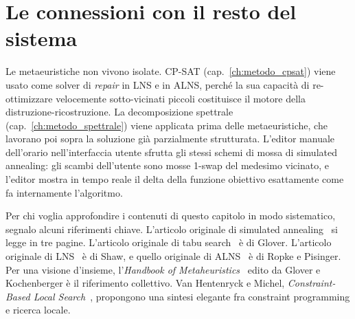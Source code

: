 \section{Le connessioni con il resto del sistema}

Le metaeuristiche non vivono isolate. CP-SAT
(cap.~\ref{ch:metodo_cpsat}) viene usato come solver di
\emph{repair} in LNS e in ALNS, perch\'e la sua capacit\`a
di re-ottimizzare velocemente sotto-vicinati piccoli
costituisce il motore della distruzione-ricostruzione. La
decomposizione spettrale (cap.~\ref{ch:metodo_spettrale})
viene applicata prima delle metaeuristiche, che lavorano poi
sopra la soluzione gi\`a parzialmente strutturata. L'editor
manuale dell'orario nell'interfaccia utente sfrutta gli
stessi schemi di mossa di simulated annealing: gli scambi
dell'utente sono mosse 1-swap del medesimo vicinato, e
l'editor mostra in tempo reale il delta della funzione
obiettivo esattamente come fa internamente l'algoritmo.

\begin{biblioparvabox}
Per chi voglia approfondire i contenuti di questo capitolo
in modo sistematico, segnalo alcuni riferimenti chiave.
L'articolo originale di simulated
annealing~\parencite{kirkpatrick1983} si legge in tre
pagine. L'articolo originale di tabu
search~\parencite{glover1986} \`e di Glover. L'articolo
originale di LNS~\parencite{shaw1998} \`e di Shaw, e
quello originale di ALNS~\parencite{ropke2006} \`e di
Ropke e Pisinger. Per una visione d'insieme, l'\emph{Handbook
of Metaheuristics}~\parencite{glover2003} edito da Glover e
Kochenberger \`e il riferimento collettivo. Van Hentenryck e
Michel, \emph{Constraint-Based Local
Search}~\parencite{vanhentenryck2005}, propongono una sintesi
elegante fra constraint programming e ricerca locale.
\end{biblioparvabox}
